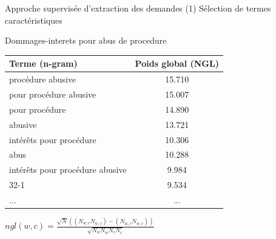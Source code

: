 \documentclass[newPxFont,pagenumber]{beamer}
\begin{document}
\begin{frame}{Approche supervisée d'extraction des demandes}
(1) Sélection de termes caractéristiques
\begin{exampleblock}{Dommages-interets pour abus de procedure}
\small
\begin{tabular}{l|c}
\textbf{Terme (n-gram)} & \textbf{Poids global (NGL)}  \\ \hline
\midrule
procédure abusive & 15.710 \\ \hline
pour procédure abusive & 15.007 \\ \hline
pour procédure & 14.890 \\ \hline
abusive & 13.721 \\ \hline
intérêts pour procédure & 10.306 \\ \hline
abus & 10.288 \\ \hline
intérêts pour procédure abusive & 9.984 \\ \hline
32-1 & 9.534\\ \hline
... & ...
\end{tabular}
\end{exampleblock}
$ngl(w,c) = \frac{\sqrt{N} ((N_{w,c} N_{\overline{w},\overline{c}}) - (N_{w,\overline{c}} N_{\overline{w},c}))}{\sqrt{N_w N_{\overline{w}} N_c N_{\overline{c}}}}$ \cite{ng1997ngl}
\end{frame}

\end{document}

